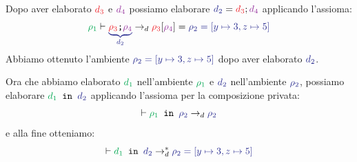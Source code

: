 \documentclass[a4paper]{article}
\begin{document}
\begin{example}
\begin{enumerate}
\begin{enumerate}
      \end{enumerate}
      Dopo aver elaborato \( \mathcolor{\dThree}{d_3} \) e
      \( \mathcolor{\dFour}{d_4} \) possiamo elaborare
      \( \mathcolor{\dTwo}{d_2} = \mathcolor{\dThree}{d_3}; \mathcolor{\dFour}{d_4} \)
      applicando l'assioma:
      \[
        \mathcolor{\dOne}{\rho_1} \vdash
        \mathcolor{\dTwo}{
          \underbrace{
            \mathcolor{\dThree}{\rho_3} \texttt{\textcolor{black}{;}} \mathcolor{\dFour}{\rho_4}
          }_{d_2}
        }
        \to_d
        \mathcolor{\dThree}{\rho_3}[\mathcolor{\dFour}{\rho_4}]
        = \mathcolor{\dTwo}{\rho_2 =}
        \mathcolor{\dTwo}{\left[ y \mapsto 3, z \mapsto 5 \right]}
      \] 
      Abbiamo ottenuto l'ambiente
      \( \mathcolor{\dTwo}{\rho_2 = \left[ y \mapsto 3, z \mapsto 5 \right]} \) dopo
      aver elaborato \( \mathcolor{\dTwo}{d_2} \).
  \end{enumerate}
  Ora che abbiamo elaborato \( \mathcolor{\dOne}{d_1} \) nell'ambiente
  \( \mathcolor{\dOne}{\rho_1} \) e \( \mathcolor{\dTwo}{d_2} \) nell'ambiente
  \( \mathcolor{\dTwo}{\rho_2} \), possiamo elaborare
  \( \mathcolor{\dOne}{d_1} \texttt{ in } \mathcolor{\dTwo}{d_2} \) applicando
  l'assioma per la composizione privata:
  \[
    \vdash \mathcolor{\dOne}{\rho_1} \texttt{ in } \mathcolor{\dTwo}{\rho_2}
    \to_d \mathcolor{\dTwo}{\rho_2}
  \] 
  e alla fine otteniamo:
  \[
    \vdash \mathcolor{\dOne}{d_1} \texttt{ in } \mathcolor{\dTwo}{d_2} \to_d^*
    \mathcolor{\dTwo}{\rho_2 = \left[ y \mapsto 3, z \mapsto 5 \right]}
  \] 
\end{example}
\end{document}

